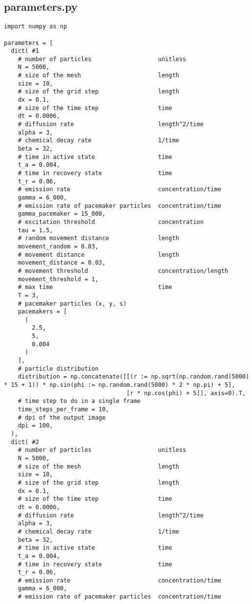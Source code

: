 \subsection{parameters.py}

\begin{verbatim}
import numpy as np

parameters = [
  dict( #1
    # number of particles                   unitless
    N = 5000,
    # size of the mesh                      length
    size = 10,
    # size of the grid step                 length
    dx = 0.1,
    # size of the time step                 time
    dt = 0.0006,
    # diffusion rate                        length^2/time
    alpha = 3,
    # chemical decay rate                   1/time
    beta = 32,
    # time in active state                  time
    t_a = 0.004,
    # time in recovery state                time
    t_r = 0.06,
    # emission rate                         concentration/time
    gamma = 6_000,
    # emission rate of pacemaker particles  concentration/time
    gamma_pacemaker = 15_000,
    # excitation threshold                  concentration
    tau = 1.5,
    # random movement distance              length
    movement_random = 0.03,
    # movement distance                     length
    movement_distance = 0.03,
    # movement threshold                    concentration/length
    movement_threshold = 1,
    # max time                              time
    T = 3,
    # pacemaker particles (x, y, s)
    pacemakers = [
      (
        2.5,
        5,
        0.004
      )
    ],
    # particle distribution
    distribution = np.concatenate([[(r := np.sqrt(np.random.rand(5000) * 15 + 1)) * np.sin(phi := np.random.rand(5000) * 2 * np.pi) + 5],
                                   [r * np.cos(phi) + 5]], axis=0).T,
    # time step to do in a single frame
    time_steps_per_frame = 10,
    # dpi of the output image
    dpi = 100,
  ),
  dict( #2
    # number of particles                   unitless
    N = 5000,
    # size of the mesh                      length
    size = 10,
    # size of the grid step                 length
    dx = 0.1,
    # size of the time step                 time
    dt = 0.0006,
    # diffusion rate                        length^2/time
    alpha = 3,
    # chemical decay rate                   1/time
    beta = 32,
    # time in active state                  time
    t_a = 0.004,
    # time in recovery state                time
    t_r = 0.06,
    # emission rate                         concentration/time
    gamma = 6_000,
    # emission rate of pacemaker particles  concentration/time

\end{verbatim}
